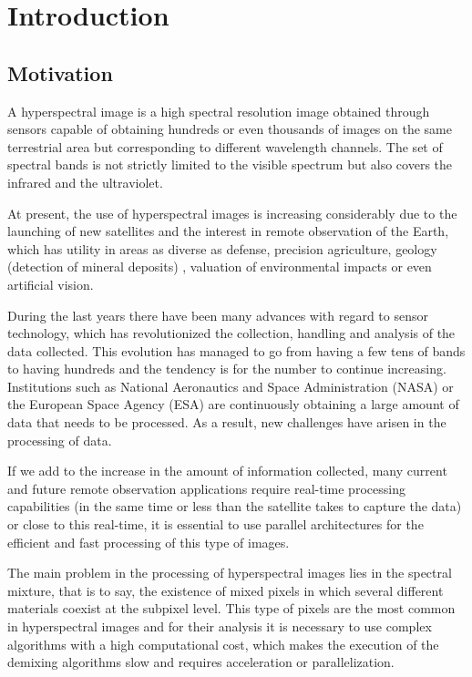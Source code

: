 \newpage

\chapter{Introduction}
\label{Appendix:Introduccion}

\section{Motivation}

A hyperspectral image is a high spectral resolution image obtained through sensors capable of obtaining hundreds or even thousands of images on the same terrestrial area but corresponding to different wavelength channels. The set of spectral bands is not strictly limited to the visible spectrum but also covers the infrared and the ultraviolet.

At present, the use of hyperspectral images is increasing considerably due to the launching of new satellites and the interest in remote observation of the Earth, which has utility in areas as diverse as defense, precision agriculture, geology (detection of mineral deposits) , valuation of environmental impacts or even artificial vision.

During the last years there have been many advances with regard to sensor technology, which has revolutionized the collection, handling and analysis of the data collected. This evolution has managed to go from having a few tens of bands to having hundreds and the tendency is for the number to continue increasing. Institutions such as National Aeronautics and Space Administration (NASA) or the European Space Agency (ESA) are continuously obtaining a large amount of data that needs to be processed. As a result, new challenges have arisen in the processing of data.

If we add to the increase in the amount of information collected, many current and future remote observation applications require real-time processing capabilities (in the same time or less than the satellite takes to capture the data) or close to this real-time, it is essential to use parallel architectures for the efficient \cite{HPC_aplaza} and fast processing of this type of images.

The main problem in the processing of hyperspectral images lies in the spectral mixture, that is to say, the existence of mixed pixels in which several different materials coexist at the subpixel level. This type of pixels are the most common in hyperspectral images and for their analysis it is necessary to use complex algorithms with a high computational cost, which makes the execution of the demixing algorithms slow and requires acceleration or parallelization.

